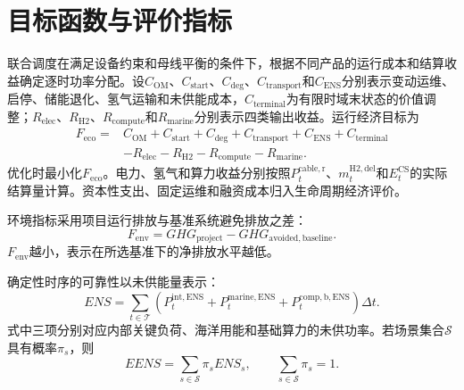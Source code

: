 \section{目标函数与评价指标}
\label{sec:objective}

联合调度在满足设备约束和母线平衡的条件下，根据不同产品的运行成本和结算收益确定逐时功率分配。设$C_{\mathrm{OM}}$、$C_{\mathrm{start}}$、$C_{\mathrm{deg}}$、$C_{\mathrm{transport}}$和$C_{\mathrm{ENS}}$分别表示变动运维、启停、储能退化、氢气运输和未供能成本，$C_{\mathrm{terminal}}$为有限时域末状态的价值调整；$R_{\mathrm{elec}}$、$R_{\mathrm{H2}}$、$R_{\mathrm{compute}}$和$R_{\mathrm{marine}}$分别表示四类输出收益。运行经济目标为
\begin{equation}
\begin{aligned}
F_{\mathrm{eco}}={}&
C_{\mathrm{OM}}+C_{\mathrm{start}}+C_{\mathrm{deg}}
+C_{\mathrm{transport}}+C_{\mathrm{ENS}}+C_{\mathrm{terminal}}\\
&-R_{\mathrm{elec}}-R_{\mathrm{H2}}
-R_{\mathrm{compute}}-R_{\mathrm{marine}}.
\end{aligned}
\label{eq:economic-objective}
\end{equation}
优化时最小化$F_{\mathrm{eco}}$。电力、氢气和算力收益分别按照$P_t^{\mathrm{cable,r}}$、$m_t^{\mathrm{H2,del}}$和$E_t^{\mathrm{CS}}$的实际结算量计算。资本性支出、固定运维和融资成本归入生命周期经济评价。

环境指标采用项目运行排放与基准系统避免排放之差：
\begin{equation}
F_{\mathrm{env}}
=GHG_{\mathrm{project}}-GHG_{\mathrm{avoided,baseline}}.
\label{eq:environment-objective}
\end{equation}
$F_{\mathrm{env}}$越小，表示在所选基准下的净排放水平越低。

确定性时序的可靠性以未供能量表示：
\begin{equation}
ENS=\sum_{t\in\mathcal T}
\left(
P_t^{\mathrm{int,ENS}}
+P_t^{\mathrm{marine,ENS}}
+P_t^{\mathrm{comp,b,ENS}}
\right)\Delta t.
\label{eq:ens}
\end{equation}
式中三项分别对应内部关键负荷、海洋用能和基础算力的未供功率。若场景集合$\mathcal S$具有概率$\pi_s$，则
\begin{equation}
EENS=\sum_{s\in\mathcal S}\pi_sENS_s,
\qquad
\sum_{s\in\mathcal S}\pi_s=1.
\label{eq:eens}
\end{equation}

